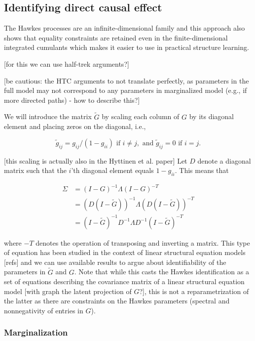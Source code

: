 \documentclass[accepted]{uai2021} %
\begin{document}

\subsection{Identifying direct causal effect}

The Hawkes processes are an infinite-dimensional family and this approach also 
shows that equality constraints are retained even in the finite-dimensional 
integrated cumulants which makes it easier to use in practical structure 
learning.

[for this we can use half-trek arguments?]

[be cautious: the HTC arguments to not translate perfectly, as parameters in 
the full model may not correspond to any parameters in marginalized model 
(e.g., if more directed paths) - how to describe this?]

We will introduce the matrix $\tilde{G}$ by scaling each column of $G$ by its 
diagonal element and placing zeros on the diagonal, i.e.,

$$
\tilde{g}_{ij} = g_{ij}/(1-g_{ii})  \text{ if } i\neq j, \text{ and } 
\tilde{g}_{ij} 
= 0 \text{ if } i= j.
$$

[this scaling is actually also in the Hyttinen et al. paper] Let $D$ denote a 
diagonal matrix such that the $i$'th diagonal element equals 
$1 - g_{ii}$. This means that 

\begin{align*}
\Sigma & = (I - G)^{-1}\Lambda (I - G)^{-T}  \\
& = (D(I - \tilde{G}))^{-1}\Lambda (D(I - \tilde{G}))^{-T} \\
& = (I - \tilde{G})^{-1}D^{-1} \Lambda D^{-1}(I - 
\tilde{G})^{-T}
\end{align*}



where $-T$ denotes the operation of transposing and inverting a matrix. This 
type of equation has been studied in the context of linear structural 
equation models [refs] and we can use available results to argue about 
identifiability of the parameters in $\tilde{G}$ and $G$. Note that while this 
casts the Hawkes identification as a set of equations describing the covariance 
matrix of a linear structural equation model [with graph the latent projection 
of $G$?], this is not a reparametrization 
of the latter as there are constraints on the Hawkes parameters (spectral 
and nonnegativity of entries in $G$).


\subsubsection{Marginalization}
\end{document}
